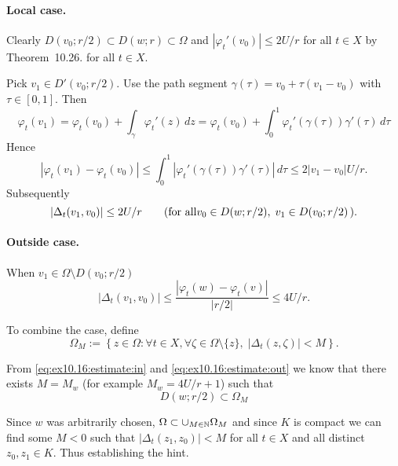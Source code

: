 \begin{enumerate}
\paragraph{Local case.}
Clearly \(D(v_0;r/2)\subset D(w;r)\subset\Omega\) and
\(|{\varphi_t}'(v_0)| \leq 2U/r\) for all \(t\in X\) by Theorem~10.26.
for all \(t\in X\).

Pick \(v_1\in D'(v_0;r/2)\). 
Use the path segment 
\(\gamma(\tau) = v_0 + \tau(v_1-v_0)\) with \(\tau\in[0,1]\).
Then
\begin{equation*}
\varphi_t(v_1) 
= \varphi_t(v_0) + \int_\gamma {\varphi_t}'(z)\,dz
= \varphi_t(v_0) + \int_0^1 {\varphi_t}'(\gamma(\tau))\gamma'(\tau)\,d\tau
\end{equation*}
Hence
\begin{equation*}
\left|\varphi_t(v_1) - \varphi_t(v_0)\right|
\leq \int_0^1 \left|{\varphi_t}'(\gamma(\tau))\gamma'(\tau)\right|\,d\tau
\leq 2|v_1-v_0|U/r.
\end{equation*}
Subsequently
\begin{equation} \label{eq:ex10.16:estimate:in}
|\Delta_t(v_1,v_0)| \leq 2U/r 
\qquad (\textnormal{for all} v_0\in D(w;r/2),\;v_1 \in D(v_0;r/2)\,).
\end{equation}

\paragraph{Outside case.}
When \(v_1\in\Omega \setminus D(v_0;r/2)\)
\begin{equation} \label{eq:ex10.16:estimate:out}
|\Delta_t(v_1,v_0)| 
\leq \frac{|\varphi_t(w) - \varphi_t(v)|}{|r/2|} \leq 4U/r.
\end{equation}

To combine the case, define
\begin{equation*}
\Omega_M := 
\left\{z\in\Omega: 
  \forall t\in X, \forall \zeta\in\Omega\setminus\{z\},\; |\Delta_t(z,\zeta)|<M
\right\}.
\end{equation*}

From \eqref{eq:ex10.16:estimate:in} and \eqref{eq:ex10.16:estimate:out}
we know that there exists \(M = M_w\) (for example \(M_w = 4U/r + 1\))
such that 
\begin{equation*}
D(w;r/2) \subset \Omega_M
\end{equation*}

Since $w$ was arbitrarily chosen, \(\Omega \subset \cup_{M\in\mathbb{N}}\Omega_M\)
and since $K$ is compact we can find some \(M<0\) such that 
\(|\Delta_t(z_1,z_0)|<M\) for all \(t\in X\) and all distinct \(z_0,z_1\in K\).
Thus establishing the hint.


\end{enumerate}
